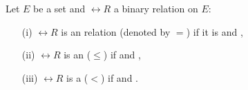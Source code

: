 \begin{definition} Let $E$ be a set and $\rel{R}$ a binary relation on $E$:
\begin{itemize}
	\item[(i)] $\rel{R}$ is an  relation (denoted by $=$) 
	if it is  and ,
	
	\item[(ii)] $\rel{R}$ is an  ($\leq$) if 
	 and ,
	
	\item[(iii)] $\rel{R}$ is a  ($<$) if 
	 and .
\end{itemize}
	
\end{definition}

